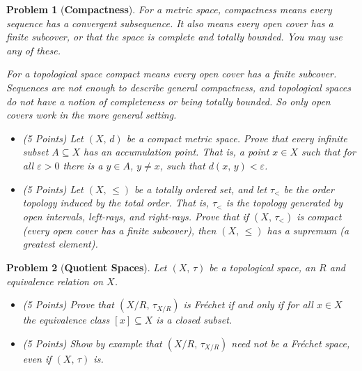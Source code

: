 \documentclass{article}
\theoremstyle{normal}
\newtheorem{problem}{Problem}
\begin{document}
    \begin{problem}[\textbf{Compactness}]
        \par\hfill\par
        For a metric space, compactness means every sequence has a convergent
        subsequence. It also means every open cover has a finite subcover, or
        that the space is complete and totally bounded. You may use any of
        these.
        \par\hfill\par
        For a topological space compact means every open cover has a finite
        subcover. Sequences are not enough to describe general compactness, and
        topological spaces do not have a notion of completeness or being
        totally bounded. So only open covers work in the more general setting.
        \begin{itemize}
            \item (5 Points) Let $(X,\,d)$ be a compact metric space. Prove
                that every infinite subset $A\subseteq{X}$ has an accumulation
                point. That is, a point $x\in{X}$ such that for all
                $\varepsilon>0$ there is a $y\in{A}$, $y\ne{x}$, such that
                $d(x,\,y)<\varepsilon$.
            \item (5 Points) Let $(X,\,\leq)$ be a totally ordered set, and let
                $\tau_{<}$ be the order topology induced by the total order.
                That is, $\tau_{<}$ is the topology generated by open intervals,
                left-rays, and right-rays. Prove that if $(X,\,\tau_{<})$ is
                compact (every open cover has a finite subcover), then
                $(X,\,\leq)$ has a supremum (a greatest element).
        \end{itemize}
    \end{problem}
    \begin{problem}[\textbf{Quotient Spaces}]
        \par\hfill\par
        Let $(X,\,\tau)$ be a topological space, an $R$ and equivalence
        relation on $X$.
        \begin{itemize}
            \item (5 Points) Prove that $(X/R,\,\tau_{X/R})$ is Fr\'{e}chet
                if and only if for all $x\in{X}$ the equivalence class
                $[x]\subseteq{X}$ is a closed subset.
            \item (5 Points) Show by example that $(X/R,\,\tau_{X/R})$ need not
                be a Fr\'{e}chet space, even if $(X,\,\tau)$ is.
        \end{itemize}
    \end{problem}
\end{document}
